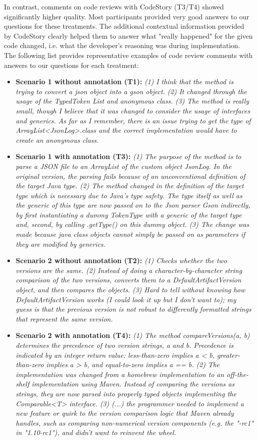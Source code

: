 \documentclass[../manifest.tex]{subfiles}
\begin{document}
In contrast, comments on code reviews with CodeStory (T3/T4) showed significantly higher quality. Most participants provided very good answers to our questions for these treatments. The additional contextual information provided by CodeStory clearly helped them to answer what "really happened" for the given code changed, i.e. what the developer's reasoning was during implementation. The following list provides representative examples of code review comments with answers to our questions for each treatment:

\begin{itemize}
  \item \textbf{Scenario 1 without annotation (T1):}
\textit{
(1) I think that the method is trying to convert a json object into a gson object.
(2) It changed through the usage of the TypedToken List and anonymous class.
(3) The method is really small, though I believe that it was changed to consider the usage of interfaces and generics. As far as I remember, there is an issue trying to get the type of  ArrayList<JsonLog>.class and the correct implementation would have to create an anonymous class.
}
  \item \textbf{Scenario 1 with annotation (T3):}
\textit{
(1) The purpose of the method is to parse a JSON file to an ArrayList of the custom object JsonLog. In the original version, the parsing fails because of an unconventional definition of the target Java type. (2) The method changed in the definition of the target type which is necessary due to Java's type safety. The type itself as well as the generic of this type are now passed on to the Json parser Gson indirectly, by first instantiating a dummy TokenType with a generic of the target type and, second, by calling .getType() on this dummy object. (3) The change was made because java class objects cannot simply be passed on as parameters if they are modified by generics.
}
  \item \textbf{Scenario 2 without annotation (T2):}
\textit{
(1) Checks whether the two versions are the same. (2) Instead of doing a character-by-character string comparison of the two versions, converts them to a DefaultArtifactVersion object, and then compares the objects. (3) Hard to tell without knowing how DefaultArtifactVersion works (I could look it up but I don't want to); my guess is that the previous version is not robust to differently formatted strings that represent the same version.
}
  \item \textbf{Scenario 2 with annotation (T4):}
\textit{
(1) The method compareVersions(a, b) determines the precedence of two version strings, a and b. Precedence is indicated by an integer return value: less-than-zero implies a < b, greater-than-zero implies a > b, and equal-to-zero implies a == b. (2) The implementation was changed from a homebrew implementation to an off-the-shelf implementation using Maven. Instead of comparing the versions as strings, they are now parsed into properly typed objects implementing the Comparable<T> interface. (3) (...) the programmer needed to implement a new feature or quirk to the version comparison logic that Maven already handles, such as comparing non-numerical version components (e.g. the "-rc1" in "1.10-rc1"), and didn't want to reinvent the wheel.
}
\end{itemize}
\end{document}
